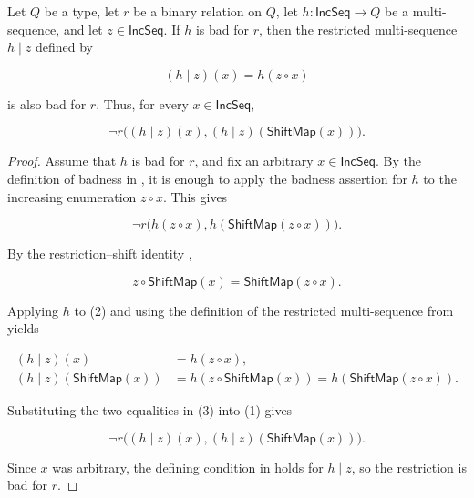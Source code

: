 \begin{lemma}
Let $Q$ be a type, let $r$ be a binary relation on $Q$, let
$h:\mathsf{IncSeq}\to Q$ be a multi-sequence, and let
$z\in\mathsf{IncSeq}$.  If $h$ is bad for $r$, then the restricted
multi-sequence $h\mathbin{|}z$ defined by

\[
(h\mathbin{|}z)(x)=h(z\circ x)
\]

is also bad for $r$.  Thus, for every $x\in\mathsf{IncSeq}$,

\[
\neg r\bigl((h\mathbin{|}z)(x),
(h\mathbin{|}z)(\mathsf{ShiftMap}(x))\bigr).
\]
\end{lemma}
\begin{proof}
Assume that $h$ is bad for $r$, and fix an arbitrary
$x\in\mathsf{IncSeq}$.  By the definition of badness in
, it is enough to apply the badness assertion for
$h$ to the increasing enumeration $z\circ x$.  This gives

\[
\neg r\bigl(h(z\circ x),h(\mathsf{ShiftMap}(z\circ x))\bigr).
\tag{1}
\]

By the restriction--shift identity ,

\[
z\circ\mathsf{ShiftMap}(x)=\mathsf{ShiftMap}(z\circ x).
\tag{2}
\]

Applying $h$ to (2) and using the definition of the restricted
multi-sequence from  yields

\[
\begin{aligned}
(h\mathbin{|}z)(x)&=h(z\circ x),\\
(h\mathbin{|}z)(\mathsf{ShiftMap}(x))
  &=h(z\circ\mathsf{ShiftMap}(x))
   =h(\mathsf{ShiftMap}(z\circ x)).
\end{aligned}
\tag{3}
\]

Substituting the two equalities in (3) into (1) gives

\[
\neg r\bigl((h\mathbin{|}z)(x),
(h\mathbin{|}z)(\mathsf{ShiftMap}(x))\bigr).
\]

Since $x$ was arbitrary, the defining condition in
 holds for $h\mathbin{|}z$, so the restriction
is bad for $r$.
\end{proof}
